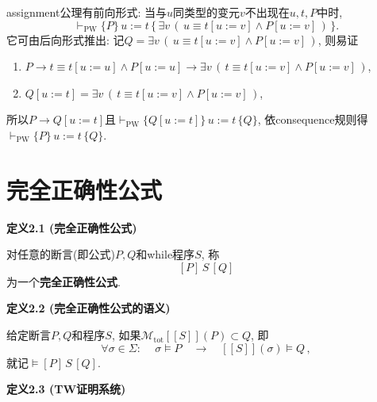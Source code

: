 \documentclass[UTF8]{ctexart}
\begin{document}
assignment公理有前向形式: 当与$u$同类型的变元$v$不出现在$u,t,P$中时,
\[
    \vdash_{\mathrm{PW}}
    \{P\}\,u:=t\,\{\,\exists v\,(\,u\equiv t[u:=v]\land P[u:=v]\,)\,\}.
\]
它可由后向形式推出: 记$Q=\exists v\,(\,u\equiv t[u:=v]\land P[u:=v]\,)$, 则易证
\begin{enumerate}
    \item $P\to t\equiv t[u:=u]\land P[u:=u]\to
    \exists v\,(\,t\equiv t[u:=v]\land P[u:=v]\,)$,
    \item $Q[u:=t]=\exists v\,(\,t\equiv t[u:=v]\land P[u:=v]\,)$,
\end{enumerate}
所以$P\to Q[u:=t]$且$\vdash_{\mathrm{PW}}\{Q[u:=t]\}\,u:=t\,\{Q\}$,
依consequence规则得$\vdash_{\mathrm{PW}}\{P\}\,u:=t\,\{Q\}$.





\newpage

\section{完全正确性公式}

\hypertarget{sec:定义2.1}{}
\noindent\textbf{定义2.1 (完全正确性公式)}

对任意的断言(即公式)$P,Q$和while程序$S$, 称
\[
    [P]\,S\,[Q]
\]
为一个\textbf{完全正确性公式}.

\vspace{10pt}

\hypertarget{sec:定义2.2}{}
\noindent\textbf{定义2.2 (完全正确性公式的语义)}

给定断言$P,Q$和程序$S$, 如果$\mathcal{M}_{\mathrm{tot}}[\![S]\!](P)\subset Q$, 即
\[
    \forall\sigma\in\Sigma:\quad\,\sigma\models P
    \quad\to\quad[\![S]\!](\sigma)\models Q\,,
\]
就记$\models[P]\,S\,[Q]$.

\vspace{10pt}

\hypertarget{sec:定义2.3}{}
\noindent\textbf{定义2.3 (TW证明系统)}
\end{document}
